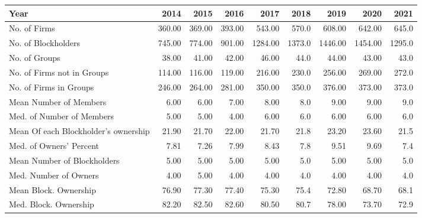 \begin{tabular}{lrrrrrrrr}
\toprule
Year &    2014 &    2015 &    2016 &     2017 &    2018 &     2019 &     2020 &    2021 \\
\midrule
No. of Firms                         &  360.00 &  369.00 &  393.00 &   543.00 &   570.0 &   608.00 &   642.00 &   645.0 \\
No. of Blockholders                  &  745.00 &  774.00 &  901.00 &  1284.00 &  1373.0 &  1446.00 &  1454.00 &  1295.0 \\
No. of Groups                        &   38.00 &   41.00 &   42.00 &    46.00 &    44.0 &    44.00 &    43.00 &    43.0 \\
No. of Firms not in Groups           &  114.00 &  116.00 &  119.00 &   216.00 &   230.0 &   256.00 &   269.00 &   272.0 \\
No. of Firms in Groups               &  246.00 &  264.00 &  281.00 &   350.00 &   350.0 &   376.00 &   373.00 &   373.0 \\
Mean Number of Members               &    6.00 &    6.00 &    7.00 &     8.00 &     8.0 &     9.00 &     9.00 &     9.0 \\
Med. of  Number of Members           &    5.00 &    5.00 &    4.00 &     6.00 &     6.0 &     6.00 &     6.00 &     6.0 \\
Mean Of each Blockholder’s ownership &   21.90 &   21.70 &   22.00 &    21.70 &    21.8 &    23.20 &    23.60 &    21.5 \\
Med. of Owners' Percent              &    7.81 &    7.26 &    7.99 &     8.43 &     7.8 &     9.51 &     9.69 &     7.4 \\
Mean Number of Blockholders          &    5.00 &    5.00 &    5.00 &     5.00 &     5.0 &     5.00 &     5.00 &     5.0 \\
Med. Number of Owners                &    4.00 &    5.00 &    4.00 &     4.00 &     4.0 &     4.00 &     4.00 &     4.0 \\
Mean Block. Ownership                &   76.90 &   77.30 &   77.40 &    75.30 &    75.4 &    72.80 &    68.70 &    68.1 \\
Med. Block. Ownership                &   82.20 &   82.50 &   82.60 &    80.50 &    80.7 &    78.00 &    73.70 &    72.9 \\
\bottomrule
\end{tabular}

